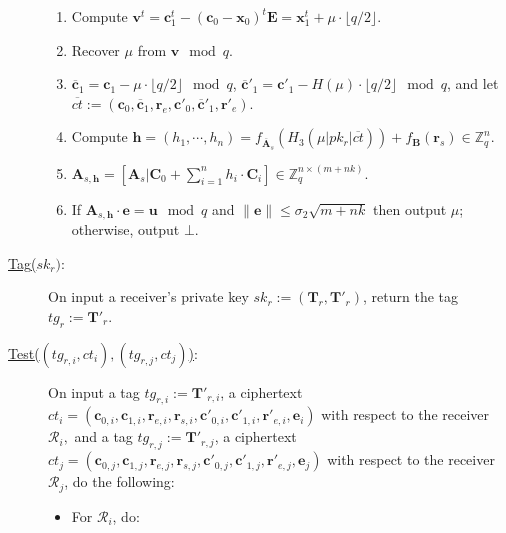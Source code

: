 \documentclass[a4paper,11pt,onecolumn]{elsarticle}
\begin{document}
\begin{description}
\begin{enumerate}
				\item Compute $\textbf{v}^t=\textbf{c}_1^t-(\textbf{c}_0-\textbf{x}_{0})^t\textbf{E}= \textbf{x}_1^t+\mu \cdot \lfloor q/2\rfloor$.
				\item Recover $\mu$ from $\textbf{v} \!\! \mod q$.
				\item  $\overline{\textbf{c}}_1=\textbf{c}_1- \mu \cdot \lfloor q/2\rfloor \!\! \mod q$, $\overline{\textbf{c}}'_1=\textbf{c}'_1- H(\mu) \cdot \lfloor q/2\rfloor \!\! \mod q$, and let $\overline{ct}:=(\textbf{c}_0, \overline{\textbf{c}}_1, \textbf{r}_e, \textbf{c}'_0, \overline{\textbf{c}}'_1, \textbf{r}'_e)$.

				\item Compute  $\textbf{h}=(h_1, \cdots, h_n)=f_{\overline{\textbf{A}}_s}(H_3(\mu| pk_r|\overline{ct}))+f_{\textbf{B}}(\textbf{r}_s)\in \mathbb{Z}_q^{n}$.
				\item $\textbf{A}_{s,\textbf{h}}=[\mathbf{A}_s|\mathbf{C}_0+\sum_{i=1}^{n}h_i\cdot \mathbf{C}_i]\in \mathbb{Z}_q^{n \times (m+nk)}$.
				\item If $\textbf{A}_{s,\textbf{h}}\cdot \textbf{e}=\textbf{u} \!\! \mod q$ and $\|\textbf{e}\|\leq \sigma_2\sqrt{m+nk}$ then 
				output $\mu$; otherwise, output $\bot$.
			\end{enumerate}
	\item [\underline{\textsf{Tag}($sk_r)$}:] On input a receiver's private key $sk_r:=(\textbf{T}_{r}, \textbf{T}'_{r})$,  return the tag $ tg_r:=\textbf{T}'_{r}$.
	
		\item[ \underline{\textsf{Test}($(tg_{r,i},ct_i),(tg_{r,j},ct_j)$)}:] On input a tag $ tg_{r,i}:=\textbf{T}'_{r,i}$, a ciphertext $ct_i=(\textbf{c}_{0,i}, \textbf{c}_{1,i}, \textbf{r}_{e, i}, \textbf{r}_{s, i},  \textbf{c}'_{0,i}, \textbf{c}'_{1,i}, \textbf{r}'_{e, i},  \textbf{e}_{i})$ with respect to the receiver $\mathcal{R}_i,$  and a tag $ tg_{r,j}:=\textbf{T}'_{r,j}$, a ciphertext $ct_j=(\textbf{c}_{0,j}, \textbf{c}_{1,j}, \textbf{r}_{e, j}, \textbf{r}_{s, j}, \textbf{c}'_{0,j}, \textbf{c}'_{1,j}, \textbf{r}'_{e, j},  \textbf{e}_{j})$ with respect to the receiver  $\mathcal{R}_j$, do the following:
		\begin{itemize}
			\item For $\mathcal{R}_i$, do:
				\begin{enumerate}
		

\end{enumerate}
\end{itemize}
\end{description}
\end{document}
